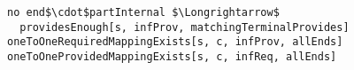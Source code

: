 \lstset{frame=tb, aboveskip=12pt, belowskip=-3pt, breaklines=true, basicstyle=\small\ttfamily, tabsize=2, mathescape=true}
\begin{lstlisting}[caption={port\_inference.als, lines 148-151}, label=alloy:WF_PI_PROVIDES_ENOUGH, captionpos=b]
no end$\cdot$partInternal $\Longrightarrow$
  providesEnough[s, infProv, matchingTerminalProvides]
oneToOneRequiredMappingExists[s, c, infProv, allEnds]
oneToOneProvidedMappingExists[s, c, infReq, allEnds]
\end{lstlisting}